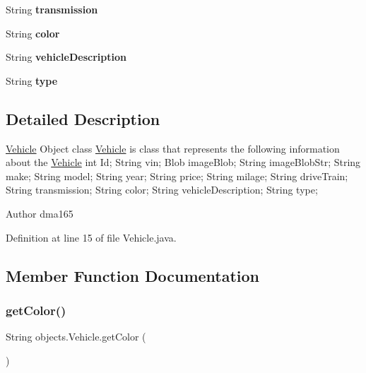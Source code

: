 \begin{DoxyCompactItemize}
String {\bfseries transmission}
\item 
\mbox{\label{classobjects_1_1_vehicle_af37a6c8b6857830e55fa67d66ac9e262}} 
String {\bfseries color}
\item 
\mbox{\label{classobjects_1_1_vehicle_a08cbd57139f8e05b706312e7afe65328}} 
String {\bfseries vehicle\+Description}
\item 
\mbox{\label{classobjects_1_1_vehicle_a71a7443ba13181a12ad4473f9a6b70be}} 
String {\bfseries type}
\end{DoxyCompactItemize}


\subsection{Detailed Description}
\mbox{\hyperlink{classobjects_1_1_vehicle}{Vehicle}} Object class \mbox{\hyperlink{classobjects_1_1_vehicle}{Vehicle}} is class that represents the following information about the \mbox{\hyperlink{classobjects_1_1_vehicle}{Vehicle}} int Id; String vin; Blob image\+Blob; String image\+Blob\+Str; String make; String model; String year; String price; String milage; String drive\+Train; String transmission; String color; String vehicle\+Description; String type;\begin{DoxyAuthor}{Author}
dma165 
\end{DoxyAuthor}


Definition at line 15 of file Vehicle.\+java.



\subsection{Member Function Documentation}
\mbox{\label{classobjects_1_1_vehicle_a0c2cca75bbfd0040bd8b25688e5e7333}} 
\subsubsection{\texorpdfstring{getColor()}{getColor()}}
{\footnotesize\ttfamily String objects.\+Vehicle.\+get\+Color (\begin{DoxyParamCaption}{ }\end{DoxyParamCaption})}

